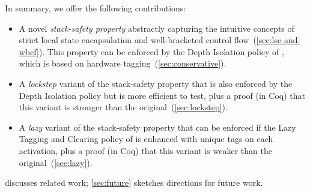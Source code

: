 \documentclass[acmsmall,review,anonymous]{acmart}\settopmatter{printfolios=true,printccs=false,printacmref=false}
\begin{document}
In summary, we offer the following contributions:
\begin{itemize}
\item
  A novel {\em stack-safety property} abstractly capturing the
  intuitive concepts of strict local state encapsulation and well-bracketed
  control flow~(\cref{sec:lse-and-wbcf}).
  This property can be enforced by
  the Depth Isolation policy of \citet{DBLP:conf/sp/RoesslerD18}, which is
  based on hardware tagging~(\cref{sec:conservative}).
\item
  A {\em lockstep} variant of the stack-safety property that is also
  enforced by the Depth Isolation policy
  but is more efficient to test, plus a proof (in Coq) that this variant is
  stronger than the original~(\cref{sec:lockstep}).
\item
  A {\em lazy} variant of the stack-safety property that can be enforced if the
  Lazy Tagging and Clearing policy of \citet{DBLP:conf/sp/RoesslerD18} is enhanced
  with unique tags on each activation, plus a proof (in Coq) that this
  variant is weaker than the original~(\cref{sec:lazy}).
%

\end{itemize}
 discusses related work;
\cref{sec:future} sketches directions for future work.
\end{document}
